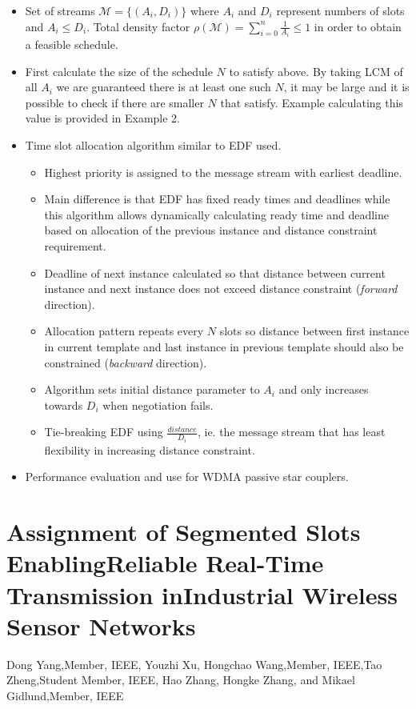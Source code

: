 \documentclass{article}
\begin{document}
\begin{itemize}
    \item Set of streams $\mathcal{M}=\{(A_i, D_i)\}$ where $A_i$ and $D_i$ represent numbers of slots and $A_i \leq D_i$.  Total density factor $\rho(\mathcal{M}) = \sum_{i=0}^n \frac{1}{A_i} \leq 1$ in order to obtain a feasible schedule.
    \item First calculate the size of the schedule $N$ to satisfy above. By taking LCM of all $A_i$ we are guaranteed there is at least one such $N$, it may be large and it is possible to check if there are smaller $N$ that satisfy.  Example calculating this value is provided in Example 2.
    \item Time slot allocation algorithm similar to EDF used.
    \begin{itemize}
        \item Highest priority is assigned to the message stream with earliest deadline.
        \item Main difference is that EDF has fixed ready times and deadlines while this algorithm allows dynamically calculating ready time and deadline based on allocation of the previous instance and distance constraint requirement.
        \item Deadline of next instance calculated so that distance between current instance and next instance does not exceed distance constraint (\emph{forward} direction).
        \item Allocation pattern repeats every $N$ slots so distance between first instance in current template and last instance in previous template should also be constrained (\emph{backward} direction).
        \item Algorithm sets initial distance parameter to $A_i$ and only increases towards $D_i$ when negotiation fails.
        \item Tie-breaking EDF using $\frac{distance}{D_i}$, ie. the message stream that has least flexibility in increasing distance constraint.
    \end{itemize}
    \item Performance evaluation and use for WDMA passive star couplers.
\end{itemize}

\section{Assignment of Segmented Slots EnablingReliable Real-Time Transmission inIndustrial Wireless Sensor Networks}
Dong Yang,Member, IEEE, Youzhi Xu, Hongchao Wang,Member, IEEE,Tao Zheng,Student Member, IEEE, Hao Zhang, Hongke Zhang, and Mikael Gidlund,Member, IEEE
\end{document}
